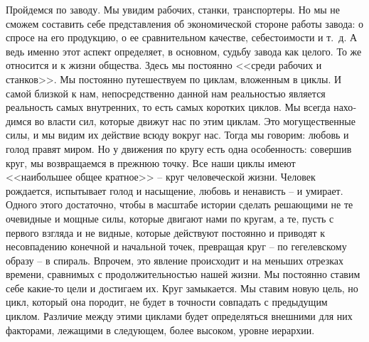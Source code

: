 \documentclass{book}
\begin{document}
Пройдемся по заводу. Мы увидим рабочих, станки, транспор­теры. Но мы не сможем составить себе представления об экономической стороне работы завода: о спросе на его продукцию, о ее сравнительном качестве, себестоимости и т.~д. А ведь именно этот аспект определяет, в основном, судьбу завода как целого. То же относится и к жизни общества. Здесь мы постоянно <<среди рабочих и станков>>. Мы постоянно путешествуем по циклам, вложенным в циклы. И самой близкой к нам, непос­редственно данной нам реальностью является реальность самых внутренних, то есть самых коротких циклов. Мы всегда нахо­димся во власти сил, которые движут нас по этим циклам. Это могущественные силы, и мы видим их действие всюду вокруг нас. Тогда мы говорим: любовь и голод правят миром. Но у движения по кругу есть одна особенность: совершив круг, мы возвращаемся в прежнюю точку. Все наши циклы имеют <<наибольшее общее кратное>> -- круг человеческой жизни. Человек рождается, испытывает голод и насыщение, любовь и нена­висть -- и умирает. Одного этого 
достаточно, чтобы в масштабе истории сделать решающими не те очевидные и мощные силы, которые двигают нами по кругам, а те, пусть с первого взгляда и не видные, которые действуют постоянно и приводят к несовпадению конечной и начальной точек, превращая круг -- по гегелевскому образу -- в спираль. Впрочем, это явление происходит и на меньших отрезках времени, сравнимых с про­должительностью нашей жизни. Мы постоянно ставим себе ка­кие-то цели и достигаем их. Круг замыкается. Мы ставим новую цель, но цикл, который она породит, не будет в точности сов­падать с предыдущим циклом. Различие между этими циклами будет определяться внешними для них факторами, лежащими в следующем, более высоком, уровне иерархии.
\end{document}
